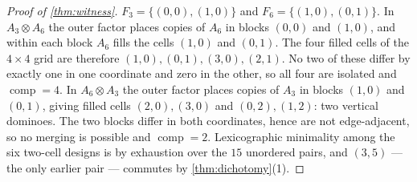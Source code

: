 \documentclass[11pt]{amsart}
\theoremstyle{definition}
\theoremstyle{remark}
\begin{document}
\begin{proof}[Proof of \cref{thm:witness}]
$F_3 = \{(0,0),(1,0)\}$ and $F_6 = \{(1,0),(0,1)\}$. In $A_3 \otimes A_6$ the outer factor places copies of $A_6$ in blocks $(0,0)$ and $(1,0)$, and within each block $A_6$ fills the cells $(1,0)$ and $(0,1)$. The four filled cells of the $4 \times 4$ grid are therefore $(1,0), (0,1), (3,0), (2,1)$. No two of these differ by exactly one in one coordinate and zero in the other, so all four are isolated and $\operatorname{comp} = 4$. In $A_6 \otimes A_3$ the outer factor places copies of $A_3$ in blocks $(1,0)$ and $(0,1)$, giving filled cells $(2,0),(3,0)$ and $(0,2),(1,2)$: two vertical dominoes. The two blocks differ in both coordinates, hence are not edge-adjacent, so no merging is possible and $\operatorname{comp} = 2$. Lexicographic minimality among the six two-cell designs is by exhaustion over the $15$ unordered pairs, and $(3,5)$ --- the only earlier pair --- commutes by \cref{thm:dichotomy}(1).
\end{proof}
\end{document}

